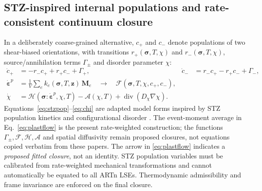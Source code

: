 \documentclass[11pt,a4paper]{article}
\begin{document}
\subsection{STZ-inspired internal populations and rate-consistent continuum closure}
In a deliberately coarse-grained alternative, $c_+$ and $c_-$ denote populations of two shear-biased orientations, with transitions $r_+(\bm\sigma,T,\chi)$ and $r_-(\bm\sigma,T,\chi)$, source/annihilation terms $\Gamma_\pm$ and disorder parameter $\chi$:
\begin{align}
 \dot c_+&=-r_-c_++r_+c_-+\Gamma_+, &
 \dot c_-&=r_-c_+-r_+c_-+\Gamma_-,\label{eq:stzpop}\\
 \dot{\bm\varepsilon}^{p}&=\frac{1}{V}\sum_e
 k_e(\bm\sigma,T,\mathbf z)\,\mathbf M_e
 \quad\longrightarrow\quad \mathcal F(\bm\sigma,T,\chi,c_+,c_-),\label{eq:plastflow}\\
 \dot\chi&=\mathcal H(\bm\sigma:\dot{\bm\varepsilon}^{p},\chi,T)-
 \mathcal A(\chi,T)+\operatorname{div}(D_\chi\nabla\chi).\label{eq:chi}
\end{align}
Equations~\eqref{eq:stzpop}--\eqref{eq:chi} are adapted model forms inspired by STZ population kinetics and configurational disorder \cite{falk1998,bouchbinder2007,falk2011}. The event-moment average in Eq.~\eqref{eq:plastflow} is the present rate-weighted construction; the functions $\Gamma_\pm,\mathcal F,\mathcal H,\mathcal A$ and spatial diffusivity remain proposed closures, not equations copied verbatim from these papers.
The arrow in \eqref{eq:plastflow} indicates a \emph{proposed fitted closure}, not an identity. STZ population variables must be calibrated from rate-weighted mechanical transformations and cannot automatically be equated to all ARTn LSEs. Thermodynamic admissibility and frame invariance are enforced on the final closure.
\end{document}
